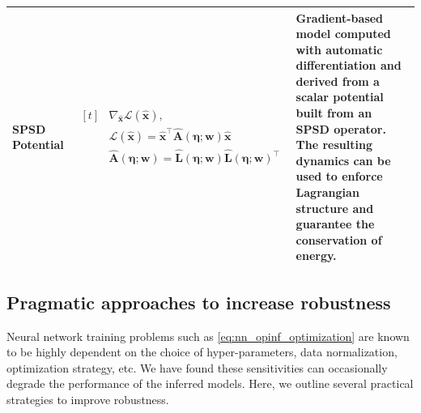 \documentclass[3p,computermodern,11pt]{elsarticle}
\numberwithin{equation}{section}
\newcommand{\reducedState}{\hat{\state}}
\newcommand{\networkInputs}{\boldsymbol \eta}
\newcommand{\reducedStiffnessMatrixNN}{\hat{\boldsymbol A}}
\newcommand{\reducedSpdMatrixLowerNN}{\hat{\boldsymbol L}}
\newcommand{\weights}{\mathbf{w}}
\newcommand{\reducedVelocity}{\skew{4}\hat{\velocity}}
\newcommand{\state}{\boldsymbol x}
\newcommand{\velocity}{\boldsymbol f}
\newcommand{\params}{\boldsymbol \mu}
\newcommand{\nParams}{N_{\params}}
\begin{document}
\begin{table}[t]
\begin{tabularx}{\textwidth}{@{}l l X@{}}
        SPSD Potential &
        $\begin{aligned}[t]&\nabla_{\reducedState}\mathcal{L}(\reducedState), \\ &\mathcal{L}(\reducedState)=\reducedState^\intercal \reducedStiffnessMatrixNN(\networkInputs;\weights)  \reducedState \\ &\reducedStiffnessMatrixNN(\networkInputs;\weights) =  \reducedSpdMatrixLowerNN(\networkInputs;\weights)\reducedSpdMatrixLowerNN(\networkInputs;\weights)^\intercal\end{aligned}$ &
        Gradient-based model computed with automatic differentiation and derived from a scalar potential built from an SPSD operator. The resulting dynamics can be used to enforce Lagrangian structure and guarantee the conservation of energy.   \\
        \bottomrule
    \end{tabularx}
\end{table}


\subsection{Pragmatic approaches to increase robustness}
Neural network training problems such as \eqref{eq:nn_opinf_optimization} are  known to be highly dependent on the choice of hyper-parameters, data normalization, optimization strategy, etc. 
We have found these sensitivities can occasionally degrade the performance of the inferred models. 
Here, we outline several practical strategies to improve robustness. 
\end{document}
